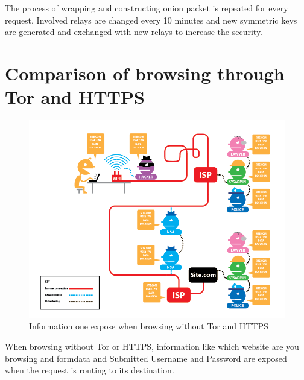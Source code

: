 \documentclass{article}
\begin{document}
      The process of wrapping and constructing onion packet is repeated for
      every request. Involved relays are changed every 10 minutes and new
      symmetric keys are generated and exchanged with new relays to increase
      the security.

    \section{Comparison of browsing through Tor and HTTPS}

      \begin{figure}[h!]
        \includegraphics[width=\linewidth]{no_tor_no_https.png}
        \caption{Information one expose when browsing without Tor and HTTPS}
        \label{fig:no_https_no_tor}
      \end{figure}

      When browsing without Tor or HTTPS, information like which website are
      you browsing and formdata and Submitted Username and Password are exposed
      when the request is routing to its destination.
\end{document}
